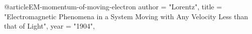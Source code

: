 @article{EM-momentum-of-moving-electron
    author  =	"Lorentz",
    title   =	"{Electromagnetic Phenomena in a System Moving with Any Velocity Less than that of Light}",
    year    =	"1904",
}
